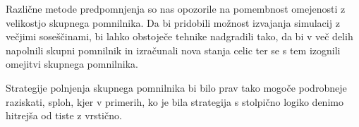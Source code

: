 \documentclass[a4paper, 12pt, openright]{book}
\begin{document}
Različne metode predpomnjenja so nas opozorile na pomembnost omejenosti z velikostjo skupnega pomnilnika.
Da bi pridobili možnost izvajanja simulacij z večjimi soseščinami, bi lahko obstoječe tehnike nadgradili tako, da bi v več delih napolnili skupni pomnilnik in izračunali nova stanja celic ter se s tem izognili omejitvi skupnega pomnilnika.


Strategije polnjenja skupnega pomnilnika bi bilo prav tako mogoče podrobneje raziskati, sploh, kjer v primerih, ko je bila strategija s stolpično logiko denimo hitrejša od tiste z vrstično.


\printbibliography[heading=bibintoc, title={Literatura}]
\end{document}
